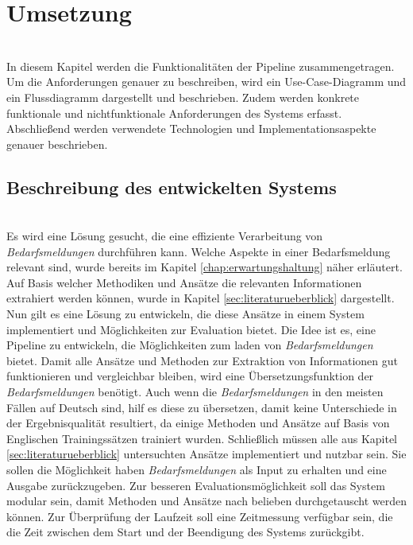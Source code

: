 \chapter{Umsetzung}
\label{chap:implementierung}
\\

In diesem Kapitel werden die Funktionalitäten der Pipeline zusammengetragen. Um die Anforderungen genauer zu beschreiben, wird ein Use-Case-Diagramm und ein Flussdiagramm dargestellt und beschrieben. Zudem werden konkrete funktionale und nichtfunktionale Anforderungen des Systems erfasst. Abschließend werden verwendete Technologien und Implementationsaspekte genauer beschrieben.
\section{Beschreibung des entwickelten Systems}
\label{sec:beschreibungsystem}
\\
Es wird eine Lösung gesucht, die eine effiziente Verarbeitung von \emph{Bedarfsmeldungen} durchführen kann. Welche Aspekte in einer Bedarfsmeldung relevant sind, wurde bereits im Kapitel \ref{chap:erwartungshaltung} näher erläutert. Auf Basis welcher Methodiken und Ansätze die relevanten Informationen extrahiert werden können, wurde in Kapitel \ref{sec:literaturueberblick} dargestellt. Nun gilt es eine Lösung zu entwickeln, die diese Ansätze in einem System implementiert und Möglichkeiten zur Evaluation bietet. Die Idee ist es, eine Pipeline zu entwickeln, die Möglichkeiten zum laden von \emph{Bedarfsmeldungen} bietet. Damit alle Ansätze und Methoden zur Extraktion von Informationen gut funktionieren und vergleichbar bleiben, wird eine Übersetzungsfunktion der \emph{Bedarfsmeldungen} benötigt. Auch wenn die \emph{Bedarfsmeldungen} in den meisten Fällen auf Deutsch sind, hilf es diese zu übersetzen, damit keine Unterschiede in der Ergebnisqualität resultiert, da einige Methoden und Ansätze auf Basis von Englischen Trainingssätzen trainiert wurden. Schließlich müssen alle aus Kapitel \ref{sec:literaturueberblick} untersuchten Ansätze implementiert und nutzbar sein. Sie sollen die Möglichkeit haben \emph{Bedarfsmeldungen} als Input zu erhalten und eine Ausgabe zurückzugeben. Zur besseren Evaluationsmöglichkeit soll das System modular sein, damit Methoden und Ansätze nach belieben durchgetauscht werden können. Zur Überprüfung der Laufzeit soll eine Zeitmessung verfügbar sein, die die Zeit zwischen dem Start und der Beendigung des Systems zurückgibt.\\

